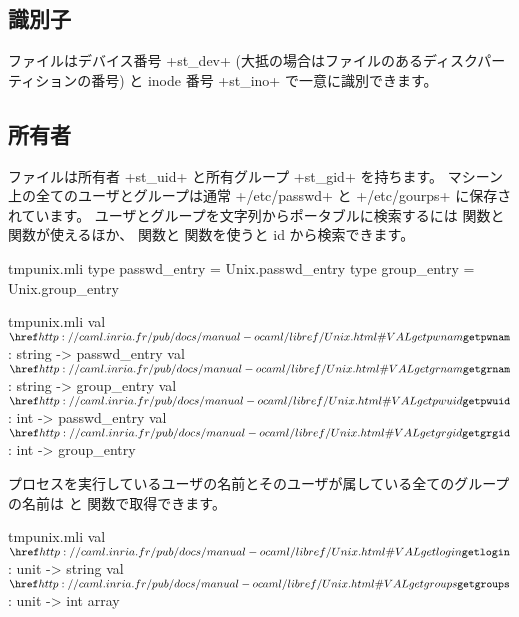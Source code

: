 \subsection*{識別子}

ファイルはデバイス番号 \ml+st_dev+ (大抵の場合はファイルのあるディスクパーティションの番号) と
inode 番号 \ml+st_ino+ で一意に識別できます。

\subsection*{所有者}

ファイルは所有者 \ml+st_uid+ と所有グループ \ml+st_gid+ を持ちます。
マシーン上の全てのユーザとグループは通常 \ml+/etc/passwd+ と \ml+/etc/gourps+ に保存されています。
ユーザとグループを文字列からポータブルに検索するには  関数と  関数が使えるほか、
 関数と  関数を使うと id から検索できます。
%
\begin{codefile}{tmpunix.mli}
type passwd_entry = Unix.passwd_entry
type group_entry = Unix.group_entry
\end{codefile}
%
\begin{listingcodefile}{tmpunix.mli}
val $\libvalue{Unix}{getpwnam}$ : string -> passwd_entry
val $\libvalue{Unix}{getgrnam}$ : string -> group_entry
val $\libvalue{Unix}{getpwuid}$ : int -> passwd_entry
val $\libvalue{Unix}{getgrgid}$ : int -> group_entry
\end{listingcodefile}

プロセスを実行しているユーザの名前とそのユーザが属している全てのグループの名前は
 と  関数で取得できます。
%
\begin{listingcodefile}{tmpunix.mli}
val $\libvalue{Unix}{getlogin}$ : unit -> string
val $\libvalue{Unix}{getgroups}$ : unit -> int array
\end{listingcodefile}

